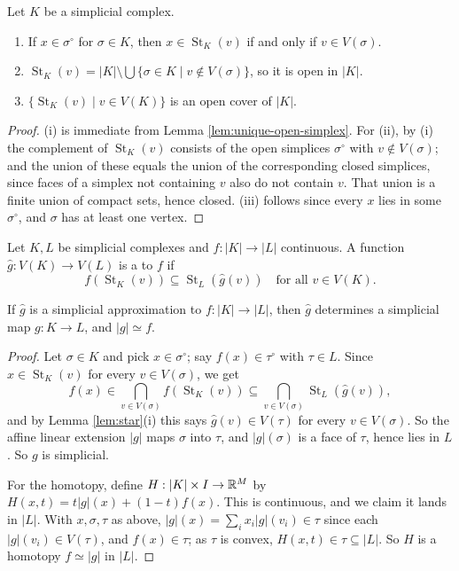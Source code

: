\documentclass[a4paper]{scrartcl}
\newcommand{\St}{\operatorname{St}}
\begin{document}
\begin{lemma} \label{lem:star}
	Let $K$ be a simplicial complex.
	\begin{enumerate}
		\item If $x \in \sigma^\circ$ for $\sigma \in K$, then $x \in \St_K(v)$ if and only if $v \in V(\sigma)$.
		\item $\St_K(v) = |K| \setminus \bigcup\{\sigma \in K \mid v \notin V(\sigma)\}$, so it is open in $|K|$.
		\item $\{\St_K(v) \mid v \in V(K)\}$ is an open cover of $|K|$.
	\end{enumerate}
\end{lemma}
\begin{proof}
	(i) is immediate from Lemma \ref{lem:unique-open-simplex}. For (ii), by (i) the complement of $\St_K(v)$ consists of the open simplices $\sigma^\circ$ with $v \notin V(\sigma)$; and the union of these equals the union of the corresponding closed simplices, since faces of a simplex not containing $v$ also do not contain $v$. That union is a finite union of compact sets, hence closed. (iii) follows since every $x$ lies in some $\sigma^\circ$, and $\sigma$ has at least one vertex.
\end{proof}

\begin{definition}
	Let $K, L$ be simplicial complexes and $f: |K| \to |L|$ continuous. A function $\hat g: V(K) \to V(L)$ is a  to $f$ if
	$$
	f(\St_K(v)) \subseteq \St_L(\hat g(v)) \quad\text{for all } v \in V(K).
	$$
\end{definition}

\begin{theorem} \label{thm:approx-is-simplicial}
	If $\hat g$ is a simplicial approximation to $f: |K|\to|L|$, then $\hat g$ determines a simplicial map $g: K \to L$, and $|g| \simeq f$.
\end{theorem}
\begin{proof}
	Let $\sigma \in K$ and pick $x \in \sigma^\circ$; say $f(x) \in \tau^\circ$ with $\tau \in L$. Since $x \in \St_K(v)$ for every $v \in V(\sigma)$, we get
	$$
	f(x) \in \bigcap_{v \in V(\sigma)} f(\St_K(v)) \subseteq \bigcap_{v\in V(\sigma)}\St_L(\hat g(v)),
	$$
	and by Lemma \ref{lem:star}(i) this says $\hat g(v) \in V(\tau)$ for every $v \in V(\sigma)$. So the affine linear extension $|g|$ maps $\sigma$ into $\tau$, and $|g|(\sigma)$ is a face of $\tau$, hence lies in $L$. So $g$ is simplicial.

	For the homotopy, define $H: |K|\times I \to \mathbb{R}^M$ by $H(x,t) = t|g|(x) + (1-t)f(x)$. This is continuous, and we claim it lands in $|L|$. With $x, \sigma, \tau$ as above, $|g|(x) = \sum_i x_i|g|(v_i) \in \tau$ since each $|g|(v_i) \in V(\tau)$, and $f(x) \in \tau$; as $\tau$ is convex, $H(x,t)\in\tau \subseteq |L|$. So $H$ is a homotopy $f \simeq |g|$ in $|L|$.
\end{proof}
\end{document}
